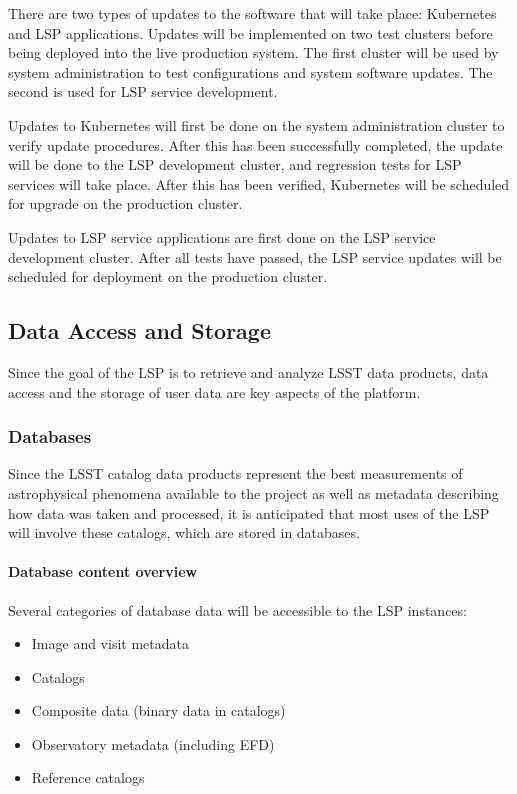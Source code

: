 There are two types of updates to the software that will take place:
Kubernetes and LSP applications.  Updates will be implemented on two test
clusters before being deployed into the live production system. The first
cluster will be used by system administration to test configurations and
system software updates.  The second is used for LSP service development.

Updates to Kubernetes will first be done on the system administration cluster
to verify update procedures. After this has been successfully completed, the
update will be done to the LSP development cluster, and regression tests for
LSP services will take place.  After this has been verified, Kubernetes will
be scheduled for upgrade on the production cluster.

Updates to LSP service applications are first done on the LSP service
development cluster. After all tests have passed, the LSP service updates
will be scheduled for deployment on the production cluster.

\subsection{Data Access and Storage}\label{data-access-and-storage}

Since the goal of the LSP is to retrieve and analyze LSST data products,
data access and the storage of user data are key aspects of the platform.

\subsubsection{Databases}\label{databases}

Since the LSST catalog data products represent the best measurements of
astrophysical phenomena available to the project as well as metadata
describing how data was taken and processed, it is anticipated that
most uses of the LSP will involve these catalogs, which are stored in
databases.

\paragraph{Database content overview}\label{database-content-overview}

Several categories of database data will be accessible to the LSP instances:
\begin{itemize}
\item Image and visit metadata
\item Catalogs
\item Composite data (binary data in catalogs)
\item Observatory metadata (including EFD)
\item Reference catalogs
\end{itemize}

